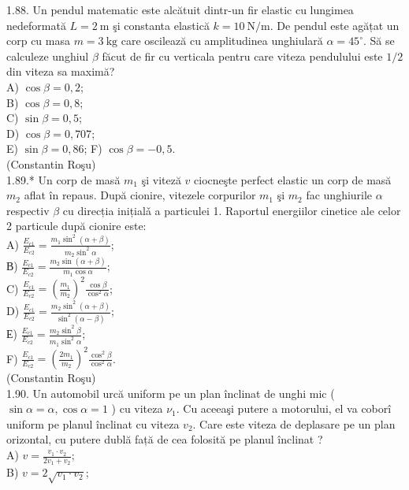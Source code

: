 \documentclass[10pt]{article}
\begin{document}
1.88. Un pendul matematic este alcătuit dintr-un fir elastic cu lungimea nedeformată $L=2 \mathrm{~m}$ şi constanta elastică $k=10 \mathrm{~N} / \mathrm{m}$. De pendul este agățat un corp cu masa $m=3 \mathrm{~kg}$ care oscilează cu amplitudinea unghiulară $\alpha=45^{\circ}$. Să se calculeze unghiul $\beta$ făcut de fir cu verticala pentru care viteza pendulului este $1 / 2$ din viteza sa maximă?\\
A) $\cos \beta=0,2$;\\
B) $\cos \beta=0,8$;\\
C) $\sin \beta=0,5$;\\
D) $\cos \beta=0,707$;\\
E) $\sin \beta=0,86$; F) $\cos \beta=-0,5$.\\
(Constantin Roşu)\\
1.89.* Un corp de masă $m_{1}$ şi viteză $v$ ciocneşte perfect elastic un corp de masă $m_{2}$ aflat în repaus. După cionire, vitezele corpurilor $m_{1}$ şi $m_{2}$ fac unghiurile $\alpha$ respectiv $\beta$ cu direcția inițialǎ a particulei 1. Raportul energiilor cinetice ale celor 2 particule după cionire este:\\
A) $\frac{E_{c 1}}{E_{c 2}}=\frac{m_{1} \sin ^{2}(\alpha+\beta)}{m_{2} \sin ^{2} \alpha}$;\\
В) $\frac{E_{c 1}}{E_{c 2}}=\frac{m_{2} \sin (\alpha+\beta)}{m_{1} \cos \alpha}$;\\
C) $\frac{E_{c 1}}{E_{c 2}}=\left(\frac{m_{1}}{m_{2}}\right)^{2} \frac{\cos \beta}{\cos ^{2} \alpha}$;\\
D) $\frac{E_{c 1}}{E_{c 2}}=\frac{m_{2} \sin ^{2}(\alpha+\beta)}{\sin ^{2}(\alpha-\beta)}$;\\
Е) $\frac{E_{c 1}}{E_{c 2}}=\frac{m_{2} \sin ^{2} \beta}{m_{1} \sin ^{2} \alpha}$;\\
F) $\frac{E_{c 1}}{E_{c 2}}=\left(\frac{2 m_{1}}{m_{2}}\right)^{2} \frac{\cos ^{2} \beta}{\cos ^{2} \alpha}$.\\
(Constantin Roşu)\\
1.90. Un automobil urcă uniform pe un plan înclinat de unghi mic ( $\sin \alpha=\alpha, \cos \alpha=1$ ) cu viteza $\nu_{1}$. Cu aceeaşi putere a motorului, el va coborî uniform pe planul înclinat cu viteza $v_{2}$. Care este viteza de deplasare pe un plan orizontal, cu putere dublă față de cea folosită pe planul înclinat ?\\
A) $v=\frac{v_{1} \cdot v_{2}}{2 v_{1}+v_{2}}$;\\
B) $v=2 \sqrt{v_{1} \cdot v_{2}}$;\\
\end{document}
